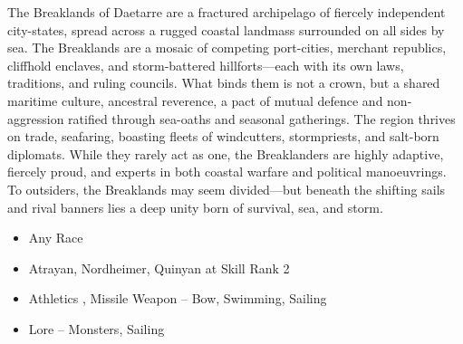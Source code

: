 
The Breaklands of Daetarre are a fractured archipelago of fiercely independent city-states, spread across a rugged coastal landmass surrounded on all sides by sea. The Breaklands are a mosaic of competing port-cities, merchant republics, cliffhold enclaves, and storm-battered hillforts—each with its own laws, traditions, and ruling councils. What binds them is not a crown, but a shared maritime culture, ancestral reverence, a pact of mutual defence and non-aggression ratified through sea-oaths and seasonal gatherings. The region thrives on trade, seafaring, boasting fleets of windcutters, stormpriests, and salt-born diplomats. While they rarely act as one, the Breaklanders are highly adaptive, fiercely proud, and experts in both coastal warfare and political manoeuvrings. To outsiders, the Breaklands may seem divided—but beneath the shifting sails and rival banners lies a deep unity born of survival, sea, and storm.

\begin{itemize}
\item Any Race
\item Atrayan, Nordheimer, Quinyan at Skill Rank 2
\item Athletics , Missile Weapon – Bow, Swimming, Sailing
\item Lore – Monsters, Sailing
\end{itemize}